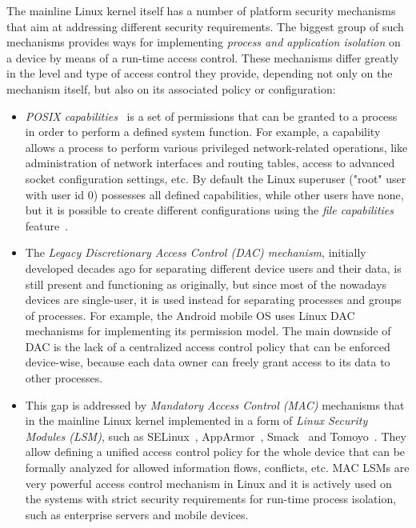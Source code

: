 The mainline Linux kernel itself has a number of platform security mechanisms that aim at addressing different security requirements. The biggest group of such mechanisms provides ways for implementing \textit{process and application isolation} on a device by means of a run-time access control. These mechanisms differ greatly in the level and type of access control they provide, depending not only on the mechanism itself, but also on its associated policy or configuration:

\begin{itemize}
	\item \textit{POSIX capabilities}~\cite{caps} is a set of permissions that can be granted to a process in order to perform a defined system function. For example, a  capability allows a process to perform various privileged network-related operations, like administration of network interfaces and routing tables, access to advanced socket configuration settings, etc. By default the Linux superuser ("root" user with user id 0) possesses all defined capabilities, while other users have none, but it is possible to create different configurations using the \textit{file capabilities} feature~\cite{filecaps}. 
	\item The \textit{Legacy Discretionary Access Control (DAC) mechanism}, initially developed decades ago for separating different device users and their data, is still present and functioning as originally, but since most of the nowadays devices are single-user, it is used instead for separating processes and groups of processes. For example, the Android mobile OS uses Linux DAC mechanisms for implementing its permission model. The main downside of DAC is the lack of a centralized access control policy that can be enforced device-wise, because each data owner can freely grant access to its data to other processes. 
	\item This gap is addressed by \textit{Mandatory Access Control (MAC)} mechanisms that in the mainline Linux kernel implemented in a form of \textit{Linux Security Modules (LSM)}, such as SELinux~\cite{smalley2001implementing}, AppArmor~\cite{bauer2006paranoid}, Smack~\cite{bauer2006paranoid} and Tomoyo~\cite{tomoyo}. They allow defining a unified access control policy for the whole device that can be formally analyzed for allowed information flows, conflicts, etc. MAC LSMs are very powerful access control mechanism in Linux and it is actively used on the systems with strict security requirements for run-time process isolation, such as enterprise servers and mobile devices. 

\end{itemize}
